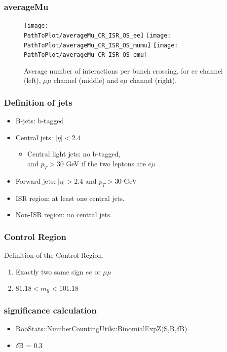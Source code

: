 \documentclass[mathserif,serif]{beamer}
\begin{document}
\begin{frame}
\frametitle{averageMu}
\begin{figure}
\texttt{[image: \\PathToPlot/averageMu\_CR\_ISR\_OS\_ee]}
\texttt{[image: \\PathToPlot/averageMu\_CR\_ISR\_OS\_mumu]}
\texttt{[image: \\PathToPlot/averageMu\_CR\_ISR\_OS\_emu]} \\
\caption{Average number of interactions per bunch crossing, for ee channel (left), $\mu\mu$ channel (middle) and e$\mu$ channel (right).}
\end{figure}
\end{frame}

\begin{frame}
\frametitle{Definition of jets}
\normalsize
\begin{itemize}
\item B-jets: b-tagged
\item Central jets: $|\eta|<2.4$
\begin{itemize}
\item Central light jets: no b-tagged,\\
and $p_T>30$ GeV if the two leptons are $e\mu$
\end{itemize}
\item Forward jets: $|\eta|>2.4$ and $p_T>30$ GeV
\item ISR region: at least one central jets.
\item Non-ISR region: no central jets.
\end{itemize}
\end{frame}

\begin{frame}
\frametitle{Control Region}
Definition of the Control Region.
\begin{enumerate}
\item Exactly two same sign $ee$ or $\mu\mu$
\item $81.18 < m_{ll} < 101.18$
\end{enumerate}
\end{frame}

\begin{frame}
\frametitle{significance calculation}
\begin{itemize}
\item RooStats::NumberCountingUtils::BinomialExpZ(S,B,$\delta$B)
\item $\delta$B = 0.3
\end{itemize}
\end{frame}
\end{document}
